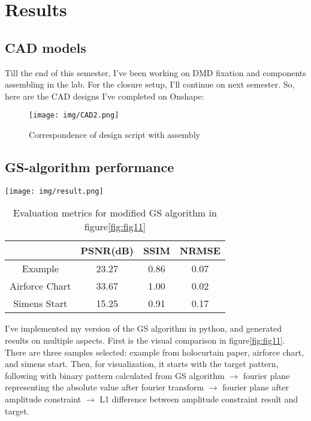 \documentclass[10pt,journal,compsoc]{IEEEtran}
\begin{document}
\section{Results}
\label{sec:Results}

\subsection{CAD models}
\label{sec:4.1}

Till the end of this semester, I've been working on DMD fixation and components assembling in the lab. For the closure setup, I'll continue on next semester. So, here are the CAD designs I've completed on Onshape:

\begin{figure}[!h]
    \centering
    \texttt{[image: img/CAD2.png]}
    \caption{Correspondence of design script with assembly}
    \label{fig:fig10}
\end{figure}

\subsection{GS-algorithm performance}
\label{sec:4.2}
\begin{figure*}[!h]
    \centering
    \texttt{[image: img/result.png]}
    \caption{Visual results of modified GS algorithm}
    \label{fig:fig11}
\end{figure*}

\begin{table}[!t]
\renewcommand{\arraystretch}{1.3}
\caption{Evaluation metrics for modified GS algorithm in figure\ref{fig:fig11}}
\centering
\begin{tabular}{c||c|c|c}
\hline
 & PSNR(dB) & SSIM & NRMSE\\
\hline\hline
Example & 23.27 & 0.86 & 0.07\\
\hline
Airforce Chart & 33.67 & 1.00 & 0.02\\
\hline
Simens Start & 15.25 & 0.91 & 0.17\\
\hline
\end{tabular}
\label{table:metrics}
\end{table}

I've implemented my version of the GS algorithm in python, and generated results on multiple aspects. First is the visual comparison in figure\ref{fig:fig11}. There are three samples selected: example from holocurtain paper, airforce chart, and simens start. Then, for visualization, it starts with the target pattern, following with binary pattern calculated from GS algorithm $\rightarrow$ fourier plane representing the absolute value after fourier transform $\rightarrow$ fourier plane after amplitude constraint $\rightarrow$ L1 difference between amplitude constraint result and target.
\end{document}
